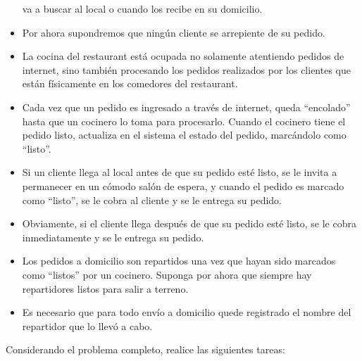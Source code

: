 \documentclass[11pt,letterpaper]{article}
\begin{document}
\begin{spacing}{1.2}
\begin{Problem}
\begin{itemize}
    va a buscar al local o cuando los recibe en su domicilio.
        \item Por ahora supondremos que ningún cliente se arrepiente de su pedido.
        \item La cocina del restaurant está ocupada no solamente atentiendo pedidos
            de internet, sino también procesando los pedidos realizados por los clientes 
            que están físicamente en los comedores del restaurant.
        \item Cada vez que un pedido es ingresado a través de internet, queda ``encolado''
            hasta que un cocinero lo toma para procesarlo. Cuando el cocinero tiene el
            pedido listo, actualiza en el sistema el estado del pedido, marcándolo como ``listo''.
        \item Si un cliente llega al local antes de que su pedido esté listo, se le invita a
            permanecer en un cómodo salón de espera, y cuando el pedido es marcado como ``listo'',
            se le cobra al cliente y se le entrega su pedido.
        \item Obviamente, si el cliente llega después de que su pedido esté listo, se le cobra
            inmediatamente y se le entrega su pedido.
        \item Los pedidos a domicilio son repartidos una vez que hayan sido marcados
            como ``listos'' por un cocinero. Suponga por ahora que siempre hay repartidores
            listos para salir a terreno.
        \item Es necesario que para todo envío a domicilio quede registrado el nombre del repartidor que
            lo llevó a cabo.
    \end{itemize}

    Considerando el problema completo, realice las siguientes tareas:


\end{Problem}
\end{spacing}
\end{document}
